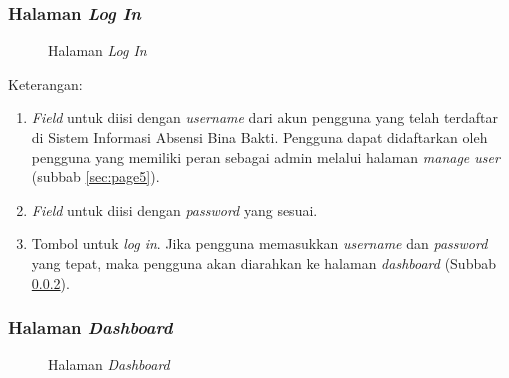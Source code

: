 \subsubsection{Halaman \textit{Log In}}
\label{sec:page1}

\begin{figure}[H]
	\centering
	\caption{Halaman \textit{Log In}}
	\label{fig:page1}
\end{figure}	

Keterangan:
\begin{enumerate}
	\item \textit{Field} untuk diisi dengan \textit{username} dari akun pengguna yang telah terdaftar di Sistem Informasi Absensi Bina Bakti. Pengguna dapat didaftarkan oleh pengguna yang memiliki peran sebagai admin melalui halaman \textit{manage user} (subbab \ref{sec:page5}).
	\item \textit{Field} untuk diisi dengan \textit{password} yang sesuai.
	\item Tombol untuk \textit{log in}. Jika pengguna memasukkan \textit{username} dan \textit{password} yang tepat, maka pengguna akan diarahkan ke halaman \textit{dashboard} (Subbab \ref{sec:page2}).
\end{enumerate}


\subsubsection{Halaman \textit{Dashboard}}
\label{sec:page2}

\begin{figure}[H]
	\centering
	\caption{Halaman \textit{Dashboard}}
	\label{fig:page2}
\end{figure}	


